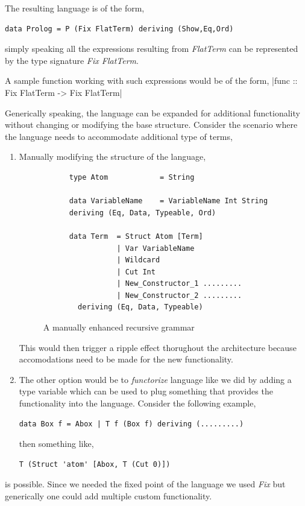 \documentclass[thesis-solanki.tex]{subfiles}
\begin{document}
The resulting language is of the form,
\begin{verbatim}
data Prolog = P (Fix FlatTerm) deriving (Show,Eq,Ord)
\end{verbatim}
%
simply speaking all the expressions resulting from \textit{FlatTerm} can be represented  by the type signature \textit{Fix FlatTerm}.

A sample function working with such expressions would be of the form,
|func :: Fix FlatTerm -> Fix FlatTerm|


Generically speaking, the language can be expanded for additional functionality without changing or modifying the base structure. Consider
the scenario where the language needs to accommodate additional type of terms,

\begin{enumerate}
\item Manually modifying the structure of the language, 
  \begin{figure}
    \begin{verbatim}
      type Atom            = String

      data VariableName    = VariableName Int String
      deriving (Eq, Data, Typeable, Ord)

      data Term  = Struct Atom [Term]
                 | Var VariableName
                 | Wildcard
                 | Cut Int
                 | New_Constructor_1 .........
                 | New_Constructor_2 .........
        deriving (Eq, Data, Typeable)
    \end{verbatim}
    \caption{A manually enhanced recursive grammar}
    \label{tab:man-enhan-gram}
  \end{figure}

This would then trigger a ripple effect thorughout the architecture because accomodations need to be made for the new functionality.

\item The other option would be to \textit{functorize} language like we did by adding a type variable which can be used to plug something that provides the functionality into the language.
Consider the following example,

\begin{verbatim}
data Box f = Abox | T f (Box f) deriving (.........)
\end{verbatim}

then something like,
\begin{verbatim}
T (Struct 'atom' [Abox, T (Cut 0)])
\end{verbatim}
\end{enumerate}
is possible. Since we needed the fixed point of the language we used \textit{Fix} but generically one could add multiple custom
functionality.
\end{document}
